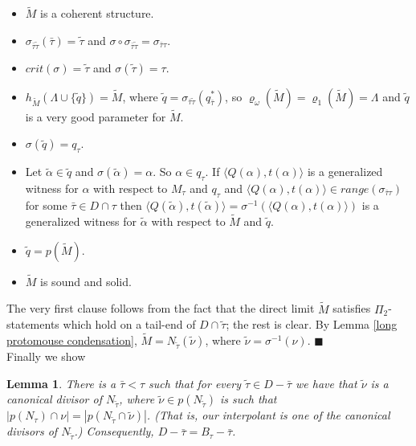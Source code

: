 \documentclass[12pt]{article}
\newtheorem{lem}[thm]{Lemma}
\begin{document}
\begin{itemize}
\item{$\tilde{M}$ is a coherent structure.}
\item{$\sigma_{\bar{\tau} \tilde{\tau}} (\bar{\tau}) = \tilde{\tau}$ and $\sigma \circ \sigma_{\bar{\tau} \tilde{\tau}} = \sigma_{\bar{\tau} \tau}$.}
\item{$crit(\sigma) = \tilde{\tau}$ and $\sigma (\tilde{\tau}) = \tau$.}
\item{$h_{\tilde{M}} ( \Lambda \cup \{ \tilde{q} \} ) = \tilde{M}$, where $\tilde{q} = \sigma_{\bar{\tau} \tilde{\tau}} ( q_{\bar{\tau}}^* )$, so $\varrho_\omega (\tilde{M}) = \varrho_1 (\tilde{M}) = \Lambda$ and $\tilde{q}$ is a very good parameter for $\tilde{M}$.}
\item{$\sigma(\tilde{q}) = q_\tau$.}
\item{Let $\tilde{\alpha} \in \tilde{q}$ and $\sigma (\tilde{\alpha}) = \alpha$.  So $\alpha \in q_\tau$.  If $\langle Q ( \alpha ) , t(\alpha ) \rangle$ is a generalized witness for $\alpha$ with respect to $M_\tau$ and $q_\tau$ and $\langle Q (\alpha ) , t ( \alpha ) \rangle \in range ( \sigma_{\bar{\tau} \tau} )$ for some $\bar{\tau} \in D \cap \tau$ then $ \langle Q (\tilde{\alpha}), t ( \tilde{\alpha } ) \rangle = \sigma^{-1} ( \langle Q (\alpha ) , t (\alpha ) \rangle )$ is a generalized witness for $\tilde{\alpha}$ with respect to $\tilde{M}$ and $\tilde{q}$.}
\item{$\tilde{q} = p ( \tilde{M} )$.}
\item{$\tilde{M}$ is sound and solid.}
\end{itemize}

The very first clause follows from the fact that the direct limit $\tilde{M}$ satisfies $\Pi_2$-statements which hold on a tail-end of $D \cap \tilde{\tau}$; the rest is clear.  By Lemma \ref{long protomouse condensation}, $\tilde{M} = N_{\tilde{\tau}} ( \tilde{\nu})$, where $\tilde{\nu} = \sigma^{-1} ( \nu )$. $\blacksquare$\\

Finally we show

\begin{lem} \label{tail-end of interpolants are canonical, long chain}
There is a $\bar{\tau} < \tau$ such that for every $\tilde{\tau} \in D - \bar{\tau}$ we have that $\tilde{\nu}$ is a canonical divisor of $N_{\tilde{\tau}}$,
where $\tilde{\nu} \in p(N_{\tilde{\tau}})$ is such that $|p(N_\tau) \cap \nu| = |p(N_{\tilde{\tau}} \cap \tilde{\nu} )|$.  (That is, our interpolant is one of the canonical divisors of $N_{\tilde{\tau}}$.)  Consequently, $D - \bar{\tau} = B_\tau - \bar{\tau}$.
\end{lem}
\end{document}
